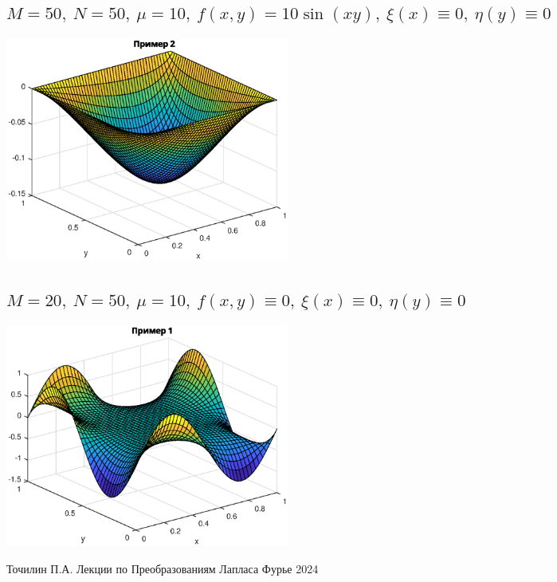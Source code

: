 \documentclass[11pt]{article}
\begin{document}
\subsection{$M = 50,\ N = 50,\ \mu= 10,\ f(x, y) = 10\sin(xy),\ \xi(x) \equiv 0, \ \eta(y) \equiv 0$}

\includegraphics[width=0.7\textwidth]{4.eps}

\subsection{$M = 20,\ N = 50,\ \mu= 10,\ f(x, y) \equiv 0,\ \xi(x) \equiv 0, \ \eta(y) \equiv 0$}

\includegraphics[width=0.7\textwidth]{5.eps}

\begin{thebibliography}{99}
 Точилин П.А. Лекции по Преобразованиям Лапласа Фурье 2024
\end{thebibliography}
\end{document}

